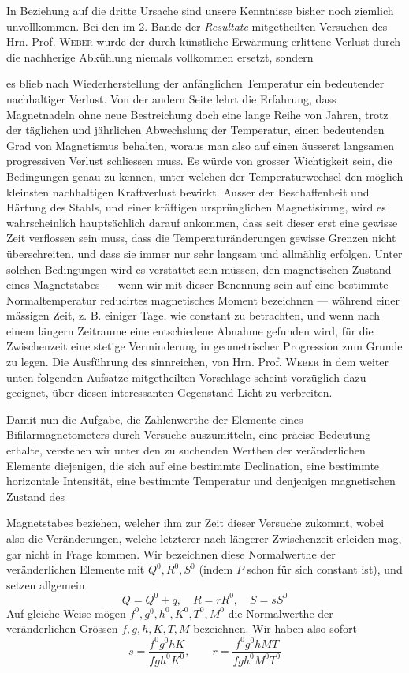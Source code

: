 In Beziehung auf die dritte Ursache sind unsere Kenntnisse bisher noch ziemlich unvollkommen. Bei den im 2. Bande der \textit{Resultate} mitgetheilten Versuchen des Hrn. Prof. \textsc{Weber} wurde der durch künstliche Erwärmung erlittene Verlust durch die nachherige Abkühlung niemals vollkommen ersetzt, sondern
\par{}
\par\clearpage
{}
\noindent es blieb nach Wiederherstellung der anfänglichen Temperatur ein bedeutender nachhaltiger Verlust. Von der andern Seite lehrt die Erfahrung, dass Magnetnadeln ohne neue Bestreichung doch eine lange Reihe von Jahren, trotz der täglichen und jährlichen Abwechslung der Temperatur, einen bedeutenden Grad von Magnetismus behalten, woraus man also auf einen äusserst langsamen progressiven Verlust schliessen muss. Es würde von grosser Wichtigkeit sein, die Bedingungen genau zu kennen, unter welchen der Temperaturwechsel den möglich kleinsten nachhaltigen Kraftverlust bewirkt. Ausser der Beschaffenheit und Härtung des Stahls, und einer kräftigen ursprünglichen Magnetisirung, wird es wahrscheinlich hauptsächlich darauf ankommen, dass seit dieser erst eine gewisse Zeit verflossen sein muss, dass die Temperaturänderungen gewisse Grenzen nicht überschreiten, und dass sie immer nur sehr langsam und allmählig erfolgen. Unter solchen Bedingungen wird es verstattet sein müssen, den magnetischen Zustand eines Magnetstabes --- wenn wir mit dieser Benennung sein auf eine bestimmte Normaltemperatur reducirtes magnetisches Moment bezeichnen --- während einer mässigen Zeit, z. B. einiger Tage, wie constant zu betrachten, und wenn nach einem längern Zeitraume eine entschiedene Abnahme gefunden wird, für die Zwischenzeit eine stetige Verminderung in geometrischer Progression zum Grunde zu legen. Die Ausführung des sinnreichen, von Hrn. Prof. \textsc{Weber} in dem weiter unten folgenden Aufsatze mitgetheilten Vorschlage scheint vorzüglich dazu geeignet, über diesen interessanten Gegenstand Licht zu verbreiten.

Damit nun die Aufgabe, die Zahlenwerthe der Elemente eines Bifilarmagnetometers durch Versuche auszumitteln, eine präcise Bedeutung erhalte, verstehen wir unter den zu suchenden Werthen der veränderlichen Elemente diejenigen, die sich auf eine bestimmte Declination, eine bestimmte horizontale Intensität, eine bestimmte Temperatur und denjenigen magnetischen Zustand des
\par\clearpage
{}
\noindent Magnetstabes beziehen, welcher ihm zur Zeit dieser Versuche zukommt, wobei also die Veränderungen, welche letzterer nach längerer Zwischenzeit erleiden mag, gar nicht in Frage kommen. Wir bezeichnen diese Normalwerthe der veränderlichen Elemente mit $Q^0,R^0,S^0$ (indem $P$ schon für sich constant ist), und setzen allgemein
\[
Q=Q^0+q,\quad R=rR^0,\quad S=sS^0
\]
Auf gleiche Weise mögen $f^0,g^0,h^0,K^0,T^0,M^0$ die Normalwerthe der veränderlichen Grössen $f,g,h,K,T,M$ bezeichnen. Wir haben also sofort
\[
s=\frac{f^0g^0hK}{fgh^0K^0},\qquad r=\frac{f^0g^0hMT}{fgh^0M^0T^0}
\]

